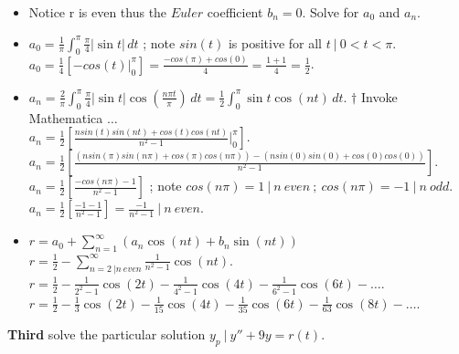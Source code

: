\documentclass[10pt]{article}
\begin{document}
\begin{itemize}
    \item Notice r is even thus the $ Euler $ coefficient $ b_n = 0 $. Solve for $ a_0 $ and $ a_n $. \\
    \item $ \displaystyle a_0 = \frac{1}{\pi}  \int_{0}^{\pi} \frac{\pi}{4} |\sin{t}| \,dt $ ; note $ sin(t) $ is positive for all $ t \ | \ 0 < t < \pi $. \\
    \subitem $ \displaystyle a_0 = \frac{1}{4} [- cos(t) \Big|_{0}^{\pi}] = \frac{- cos(\pi) + cos(0)}{4} = \frac{1 + 1}{4} = \frac{1}{2} $.
    \item $ \displaystyle a_n = \frac{2}{\pi}  \int_{0}^{\pi} \frac{\pi}{4} |\sin{t}| \cos(\frac{n\pi t}{\pi}) \,dt = \frac{1}{2}  \int_{0}^{\pi} \sin{t} \cos(nt) \,dt $. $ \dagger $ Invoke Mathematica $ \dots $ \\
    \subitem $ \displaystyle a_n = \frac{1}{2} [\frac{nsin(t)sin(nt) + cos(t)cos(nt)}{n^2 - 1} \Big|_{0}^{\pi}] $.
    \subitem $ \displaystyle a_n = \frac{1}{2} [\frac{(nsin(\pi)sin(n\pi) + cos(\pi)cos(n\pi)) - (nsin(0)sin(0) + cos(0)cos(0))}{n^2 - 1}] $. \\
    \subitem $ \displaystyle a_n = \frac{1}{2} [\frac{- cos(n\pi) - 1}{n^2 - 1}] $ ; note $ cos(n\pi) = 1 \ | \ n \ even \ ; \ cos(n\pi) = -1 \ | \ n \ odd $.
    \subitem $ \displaystyle a_n = \frac{1}{2} [\frac{- 1 - 1}{n^2 - 1}] = \frac{- 1}{n^2 - 1} \ | \ n \ even $.
    \item $ \displaystyle r = a_0 + \sum_{n = 1}^{\infty} (a_n \cos(nt) + b_n \sin (nt)) $ \\
    \subitem $ \displaystyle r = \frac{1}{2} - \sum_{n = 2 \ | n \ even}^{\infty} \frac{1}{n^2 - 1} \cos(nt) $.
    \subitem $ \displaystyle r = \frac{1}{2} - \frac{1}{2^2 - 1} \cos(2t)  - \frac{1}{4^2 - 1} \cos(4t)  - \frac{1}{6^2 - 1} \cos(6t) - \dots $.
    \subitem $ \displaystyle r = \frac{1}{2} - \frac{1}{3} \cos(2t)  - \frac{1}{15} \cos(4t)  - \frac{1}{35} \cos(6t) - \frac{1}{63} \cos(8t) - \dots $. \\
\end{itemize}
\newpage

\noindent
\textbf{Third} solve the particular solution $ y_p \ | \ y'' + 9y = r(t) $. \\
\end{document}
